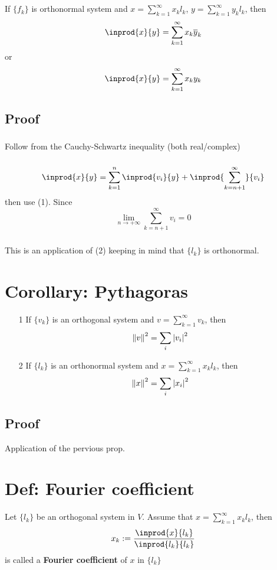 \documentclass{book}
\newcommand{\abs}[1]{\left\lvert #1 \right\rvert}
\begin{document}
\subsection*{}If $\{f_k\}$ is orthonormal system and $ x=\sum\limits_{k=1}^\infty x_kl_k$, $y=\sum\limits_{k=1}^\infty y_kl_k$, then $$\inprod{x}{y}=\sum\limits_{k=1}^\infty x_k\overline y_k$$or$$\inprod{x}{y}=\sum\limits_{k=1}^\infty x_ky_k$$
\subsection*{Proof}
\subsubsection{}Follow from the Cauchy-Schwartz inequality (both real/complex)
\subsubsection{}$$\inprod{x}{y}=\sum\limits_{k=1}^n\inprod{v_i}{y}+\inprod{\sum\limits_{k=n+1}^\infty}{v_i}$$ then use (1). Since $$\lim\limits_{n\rightarrow+\infty}\sum\limits_{k=n+1}^\infty v_i=0$$
\subsubsection{}This is an application of (2) keeping in mind that $\{l_k\}$ is orthonormal.
\section{Corollary: Pythagoras}
\label{Pythagoras}
\begin{itemize}
    \item [1]If $\{v_k\}$ is an orthogonal system and $v=\sum\limits_{k=1}^\infty v_k$, then$$\norm{v}^2=\sum\limits_i\abs{v_i}^2$$
    \item [2]If $\{l_k\}$ is an orthonormal system and $x=\sum\limits_{k=1}^\infty x_kl_k$, then$$\norm{x}^2=\sum\limits_i\abs{x_i}^2$$
\end{itemize}
\subsection*{Proof}Application of the pervious prop.
\section{Def: Fourier coefficient}
Let $\{l_k\}$ be an orthogonal system in $V$. Assume that $x=\sum\limits_{k=1}^\infty x_kl_k$, then $$x_k:=\frac{\inprod{x}{l_k}}{\inprod{l_k}{l_k}}$$
is called a \textbf{Fourier coefficient} of $x$ in $\{l_k\}$
\end{document}
